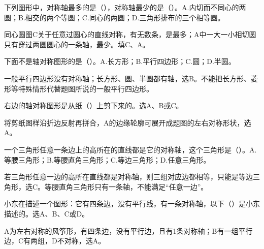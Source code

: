 下列图形中，对称轴最多的是（\hspace{1.8em}），对称轴最少的是（\hspace{1.8em}）。A.内切而不同心的两圆；B.相交的两个等圆；C.同心的两圆；D.三角形排布的三个相等圆。\par
{}
\begin{BookAnswer}
同心圆图C关于任意过圆心的直线对称，有无数条，是最多；A中一大一小相切圆只有穿过两圆圆心的一条轴，最少。填C、A。
\end{BookAnswer}

下面不是轴对称图形的是（\hspace{1.8em}）。A.长方形；B.平行四边形；C.圆；D.半圆。\par
\begin{BookAnswer}
一般平行四边形没有对称轴；长方形、圆、半圆都有轴，选B。不能把长方形、菱形等特殊情形代替题图所说的一般平行四边形。
\end{BookAnswer}

右边的轴对称图形是从纸（\hspace{1.8em}）上剪下来的。选A、B或C。\par
{}
\begin{BookAnswer}
将剪纸图样沿折边反射再拼合，A的边缘轮廓可展开成题图的左右对称形状，选A。
\end{BookAnswer}

一个三角形任意一条边上的高所在的直线都是它的对称轴，这个三角形是（\hspace{1.8em}）。A.等腰三角形；B.等腰直角三角形；C.等边三角形；D.任意三角形。\par
\begin{BookAnswer}
若三角形任意一边的高所在直线都是对称轴，则三组对应边都相等，只能是等边三角形，选C。等腰直角三角形只有一条轴，不能满足“任意一边”。
\end{BookAnswer}

小东在描述一个图形：它有四条边，没有平行线，有一条对称轴，以下（\hspace{1.8em}）是小东描述的。选A、B、C或D。\par
{}
\begin{BookAnswer}
A为左右对称的风筝形，有四条边，没有平行边，且有1条对称轴；B有一组平行边，C有两组，D不对称，选A。
\end{BookAnswer}


